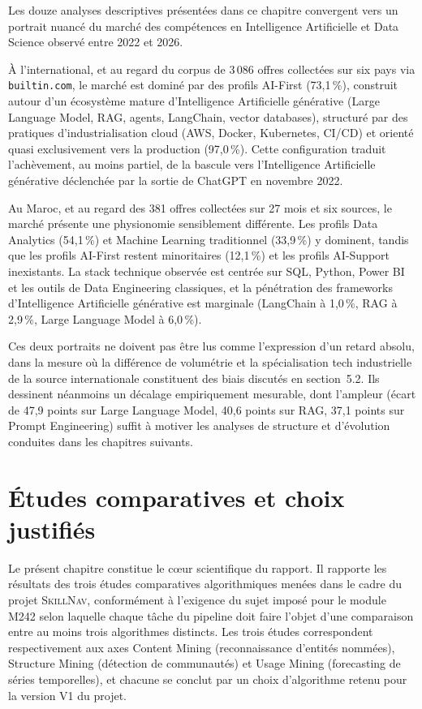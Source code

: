 \documentclass[11pt,a4paper,openany]{report}
\newcommand{\skillnav}{\textsc{SkillNav}\xspace}
\begin{document}
Les douze analyses descriptives pr\'esent\'ees dans ce chapitre convergent vers un portrait nuanc\'e du march\'e des comp\'etences en Intelligence Artificielle et Data Science observ\'e entre 2022 et 2026.

\`A l'international, et au regard du corpus de 3\,086 offres collect\'ees sur six pays via \texttt{builtin.com}, le march\'e est domin\'e par des profils AI-First (73,1\,\%), construit autour d'un \'ecosyst\`eme mature d'Intelligence Artificielle g\'en\'erative (Large Language Model, RAG, agents, LangChain, vector databases), structur\'e par des pratiques d'industrialisation cloud (AWS, Docker, Kubernetes, CI/CD) et orient\'e quasi exclusivement vers la production (97,0\,\%). Cette configuration traduit l'ach\`evement, au moins partiel, de la bascule vers l'Intelligence Artificielle g\'en\'erative d\'eclench\'ee par la sortie de ChatGPT en novembre 2022.

Au Maroc, et au regard des 381 offres collect\'ees sur 27 mois et six sources, le march\'e pr\'esente une physionomie sensiblement diff\'erente. Les profils Data Analytics (54,1\,\%) et Machine Learning traditionnel (33,9\,\%) y dominent, tandis que les profils AI-First restent minoritaires (12,1\,\%) et les profils AI-Support inexistants. La stack technique observ\'ee est centr\'ee sur SQL, Python, Power BI et les outils de Data Engineering classiques, et la p\'en\'etration des frameworks d'Intelligence Artificielle g\'en\'erative est marginale (LangChain \`a 1,0\,\%, RAG \`a 2,9\,\%, Large Language Model \`a 6,0\,\%).

Ces deux portraits ne doivent pas \^etre lus comme l'expression d'un retard absolu, dans la mesure o\`u la diff\'erence de volum\'etrie et la sp\'ecialisation tech industrielle de la source internationale constituent des biais discut\'es en section~5.2. Ils dessinent n\'eanmoins un d\'ecalage empiriquement mesurable, dont l'ampleur (\'ecart de 47,9 points sur Large Language Model, 40,6 points sur RAG, 37,1 points sur Prompt Engineering) suffit \`a motiver les analyses de structure et d'\'evolution conduites dans les chapitres suivants.

\chapter{\'Etudes comparatives et choix justifi\'es}

Le pr\'esent chapitre constitue le c\oe ur scientifique du rapport. Il rapporte les r\'esultats des trois \'etudes comparatives algorithmiques men\'ees dans le cadre du projet \skillnav, conform\'ement \`a l'exigence du sujet impos\'e pour le module M242 selon laquelle chaque t\^ache du pipeline doit faire l'objet d'une comparaison entre au moins trois algorithmes distincts. Les trois \'etudes correspondent respectivement aux axes Content Mining (reconnaissance d'entit\'es nomm\'ees), Structure Mining (d\'etection de communaut\'es) et Usage Mining (forecasting de s\'eries temporelles), et chacune se conclut par un choix d'algorithme retenu pour la version V1 du projet.
\end{document}
